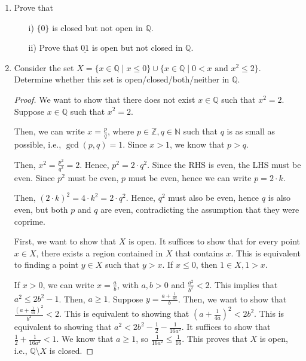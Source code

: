 \documentclass[11pt]{article}
\newcommand{\bbN}{\mathbb{N}}
\newcommand{\bbQ}{\mathbb{Q}}
\newcommand{\bbZ}{\mathbb{Z}}
\renewcommand{\_}[1]{\underline{ #1 }}
\theoremstyle{definition}
\numberwithin{equation}{subsection}
\begin{document}
\begin{enumerate}
\begin{enumerate}
\begin{proof}
\renewcommand\qedsymbol{QED}
\end{proof}

\end{enumerate}



\item Prove that 
\begin{enumerate}
\item[i)] $\{0\}$ is closed but not open in $\bbQ.$
\item[ii)] Prove that $\underline{01}$ is open but not closed in $\bbQ.$
\end{enumerate}

\item Consider the set $X=\{x\in\bbQ\mid x\leq 0\}\cup\{x\in\bbQ\mid 0< x \text{ and } x^2 \leq 2\}.$ Determine whether this set is open/closed/both/neither in $\bbQ.$

\begin{proof}
We want to show that there does not exist $x\in\mathbb{Q}$ such that $x^2 = 2$. Suppose $x \in \bbQ$ such that $x^2 = 2$.

Then, we can write $x = \frac{p}{q}$, where $p \in \bbZ, q\in \bbN$ such that $q$ is as small as possible, i.e., $\gcd(p,q)=1$. Since $x>1$, we know that $p>q$.

Then, $x^2 = \frac{p^2}{q^2} = 2$. Hence, $p^2 = 2 \cdot q^2$. Since the RHS is even, the LHS must be even. Since $p^2$ must be even, $p$ must be even, hence we can write $p = 2\cdot k$. 

Then, $(2 \cdot k)^2 = 4\cdot k^2 = 2 \cdot q^2$. Hence, $q^2$ must also be even, hence $q$ is also even, but both $p$ and $q$ are even, contradicting the assumption that they were coprime.

First, we want to show that $X$ is open. It suffices to show that for every point $x \in X$, there exists a region contained in $X$ that contains $x$. This is equivalent to finding a point $y\in X$ such that $y > x$. If $x \leq 0$, then $1 \in X, 1>x$. 

If $x >0$, we can write $x = \frac{a}{b}$, with $a,b > 0$ and $\frac{a^2}{b^2} < 2$. This implies that $a^2 \leq 2b^2 - 1$. Then, $a \geq 1$. Suppose $y = \frac{a + \frac{1}{4a}}{b}$. Then, we want to show that $\frac{(a + \frac{1}{4a})^2}{b^2}<2$. This is equivalent to showing that $(a + \frac{1}{4a})^2 < 2b^2$. This is equivalent to showing that $a ^2 < 2b^2 - \frac{1}{2} - \frac{1}{16a^2}$. It suffices to show that $\frac{1}{2} + \frac{1}{16a^2} < 1$. We know that $a \geq 1$, so $\frac{1}{16a^2} \leq \frac{1}{16}$. This proves that $X$ is open, i.e., $\bbQ \setminus X$ is closed.


\end{proof}
\end{enumerate}
\end{document}
